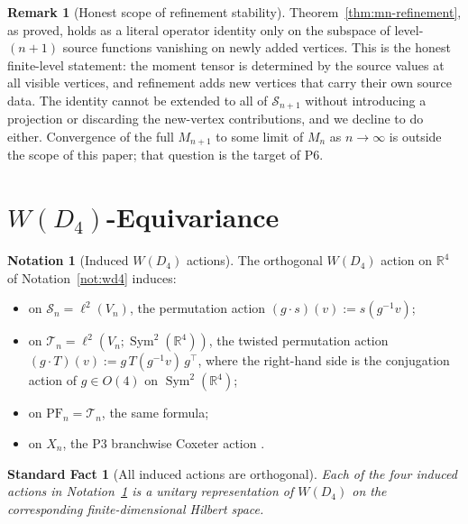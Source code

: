 \documentclass[11pt, a4paper]{amsart}
\newtheorem{fact}[theorem]{Standard Fact}
\theoremstyle{definition}
\newtheorem{remark}[theorem]{Remark}
\newtheorem{notation}[theorem]{Notation}
\newcommand{\R}{\mathbb{R}}
\newcommand{\Sym}{\operatorname{Sym}}
\newcommand{\PF}{\mathrm{PF}}
\begin{document}
\begin{remark}[Honest scope of refinement stability]
\label{rmk:refinement-scope}
Theorem~\ref{thm:mn-refinement}, as proved, holds as a literal
operator identity only on the subspace of level-$(n+1)$ source
functions vanishing on newly added vertices. This is the honest
finite-level statement: the moment tensor is determined by the
source values at all visible vertices, and refinement adds new
vertices that carry their own source data. The identity cannot be
extended to all of $\mathcal S_{n+1}$ without introducing a
projection or discarding the new-vertex contributions, and we
decline to do either. Convergence of the full $M_{n+1}$ to some
limit of $M_n$ as $n \to \infty$ is outside the scope of this
paper; that question is the target of P6.
\end{remark}

\section{$W(D_4)$-Equivariance}
\label{sec:equivariance}

\begin{notation}[Induced $W(D_4)$ actions]
\label{not:induced-actions}
The orthogonal $W(D_4)$ action on $\R^4$ of
Notation~\ref{not:wd4} induces:
\begin{itemize}
\item on $\mathcal S_n = \ell^2(V_n)$, the permutation action
  $(g \cdot s)(v) := s(g^{-1} v)$;
\item on $\mathcal T_n = \ell^2(V_n; \Sym^2(\R^4))$, the twisted
  permutation action
  $(g \cdot T)(v) := g\,T(g^{-1} v)\,g^\top$, where the
  right-hand side is the conjugation action of $g \in O(4)$ on
  $\Sym^2(\R^4)$;
\item on $\PF_n = \mathcal T_n$, the same formula;
\item on $X_n$, the P3 branchwise Coxeter action
  \cite[Def.~8.1]{RefinementSpaces}.
\end{itemize}
\end{notation}

\begin{fact}[All induced actions are orthogonal]
\label{fact:actions-orthogonal}
Each of the four induced actions in
Notation~\ref{not:induced-actions} is a unitary representation
of $W(D_4)$ on the corresponding finite-dimensional Hilbert
space.
\end{fact}
\end{document}
